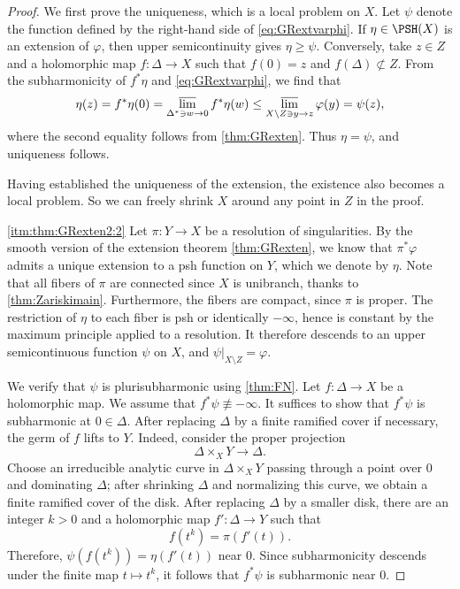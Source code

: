 \begin{proof}
    We first prove the uniqueness, which is a local problem on $X$. Let $\psi$ denote the function defined by the right-hand side of \eqref{eq:GRextvarphi}. If $\eta\in\PSH(X)$ is an extension of $\varphi$, then upper semicontinuity gives $\eta\geq\psi$. Conversely, take $z\in Z$ and a holomorphic map $f\colon \Delta\rightarrow X$ such that $f(0)=z$ and $f(\Delta)\not\subset Z$. From the subharmonicity of $f^*\eta$ and \eqref{eq:GRextvarphi}, we find that
    \[
    \eta(z)=f^*\eta(0)=\varlimsup_{\Delta^* \ni w\to 0}f^*\eta(w)\leq \varlimsup_{X\setminus Z\ni y\to z}\varphi(y)=\psi(z),
    \]
    where the second equality follows from \cref{thm:GRexten}. Thus $\eta=\psi$, and uniqueness follows.

    Having established the uniqueness of the extension, the existence also becomes a local problem. So we can freely shrink $X$ around any point in $Z$ in the proof.

    \ref{itm:thm:GRexten2:2}
    Let $\pi\colon Y\rightarrow X$ be a resolution of singularities.
    By the smooth version of the extension theorem \cref{thm:GRexten}, we know that $\pi^*\varphi$ admits a unique extension to a psh function on $Y$, which we denote by $\eta$.
    Note that all fibers of $\pi$ are connected since $X$ is unibranch, thanks to \cref{thm:Zariskimain}. Furthermore, the fibers are compact, since $\pi$ is proper.
    The restriction of $\eta$ to each fiber is psh or identically $-\infty$, hence is constant by the maximum principle applied to a resolution. It therefore descends to an upper semicontinuous function $\psi$ on $X$, and $\psi|_{X\setminus Z}=\varphi$.

    We verify that $\psi$ is plurisubharmonic using \cref{thm:FN}. Let $f\colon \Delta\rightarrow X$ be a holomorphic map. We assume that $f^*\psi\not\equiv -\infty$.
    It suffices to show that $f^*\psi$ is subharmonic at $0\in \Delta$. After replacing $\Delta$ by a finite ramified cover if necessary, the germ of $f$ lifts to $Y$. Indeed, consider the proper projection
    \[
        \Delta\times_X Y\longrightarrow \Delta.
    \]
    Choose an irreducible analytic curve in $\Delta\times_X Y$ passing through a point over $0$ and dominating $\Delta$; after shrinking $\Delta$ and normalizing this curve, we obtain a finite ramified cover of the disk. After replacing $\Delta$ by a smaller disk, there are an integer $k>0$ and a holomorphic map $f'\colon \Delta\to Y$ such that
    \[
        f(t^k)=\pi(f'(t)).
    \]
    Therefore, $\psi(f(t^k))=\eta(f'(t))$ near $0$. Since subharmonicity descends under the finite map $t\mapsto t^k$, it follows that $f^*\psi$ is subharmonic near $0$.


\end{proof}
